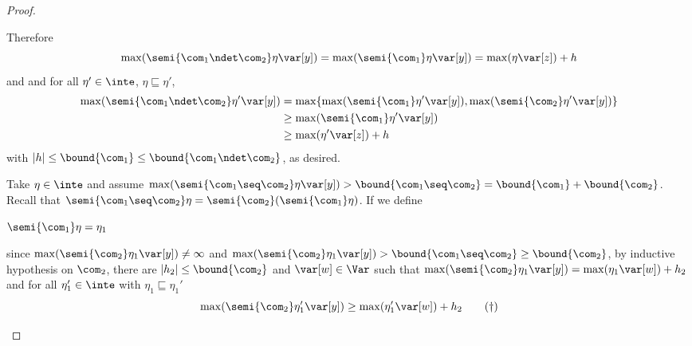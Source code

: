 \begin{proof}
\begin{inductive}
    Therefore 
    \[
      \max(\semi{\com_1 \ndet \com_2}\eta \var[y])
      = \max(\semi{\com_1}\eta \var[y]) = \max(\eta \var[z]) + h
    \]
    and and for
    all \(\eta' \in \inte\), \(\eta \sqsubseteq \eta'\),
    \begin{align*}
      \max(\semi{\com_1 \ndet \com_2}\eta' \var[y])
      &= \max\{ \max(\semi{\com_1}\eta' \var[y]),  \max(\semi{\com_2}\eta' \var[y])\}\\
      & \geq \max(\semi{\com_1}\eta' \var[y])\\
      & \geq \max(\eta' \var[z]) + h
    \end{align*}
    with \(|h| \leq \bound{\com_1} \leq \bound{\com_1 \ndet \com_2}\), as desired.

    
    Take \(\eta \in \inte\) and assume
    \(\max(\semi{\com_1 \seq \com_2}\eta\var[y]) > \bound{\com_1 \seq
      \com_2} = \bound{\com_1} + \bound{\com_2}\).  Recall that
    \(\semi{\com_1 \seq \com_2} \eta =
    \semi{\com_2}(\semi{\com_1}\eta)\).
    If we define
    \begin{center}
      \(\semi{\com_1} \eta = \eta_1\)
    \end{center}
    since \(\max(\semi{\com_2}\eta_1 \var[y]) \neq \infty\) and
    \(\max(\semi{\com_2} \eta_1 \var[y]) > \bound{\com_1 \seq \com_2}
    \geq \bound{\com_2}\), by inductive hypothesis on \(\com_2\), there
    are \(|h_2| \leq \bound{\com_2}\) and \(\var[w] \in \Var\) such that
    \(\max(\semi{\com_2} \eta_1 \var[y]) = \max(\eta_1 \var[w]) + h_2\)
    and for all \(\eta_1' \in \inte\) with
    \(\eta_1 \sqsubseteq \eta_1'\)
    \begin{equation}
      \label{eq:seq2}
      \max(\semi{\com_2} \eta_1' \var[y]) \geq \max(\eta_1' \var[w]) + h_2
      \tag{\dag}
    \end{equation}
    

\end{inductive}
\end{proof}
